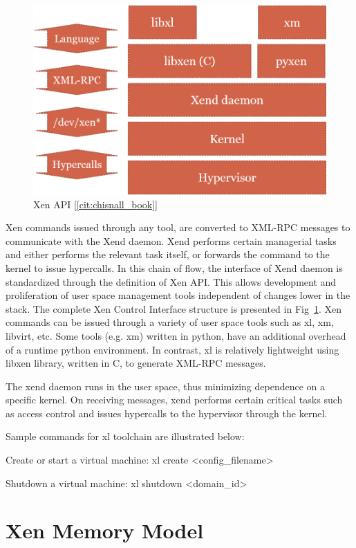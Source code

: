 \begin{figure}[H]
\centering
\includegraphics[scale=0.7]{figures/XEN_API.png}
\caption{Xen API [\ref{cit:chisnall_book}]}
\label{fig:xen_api}
\end{figure}
Xen commands issued through any tool, are converted to XML-RPC messages to communicate with the Xend daemon. Xend performs certain managerial tasks and either performs the relevant task itself, or forwards the command to the kernel to issue hypercalls. In this chain of flow, the interface of Xend daemon is standardized through the definition of Xen API. This allows development and proliferation of user space management tools independent of changes lower in the stack. The complete Xen Control Interface structure is presented in Fig~\ref{fig:xen_api}. Xen commands can be issued through a variety of user space tools such as xl, xm, libvirt, etc. Some tools (e.g. xm) written in python, have an additional overhead of a runtime python environment. In contrast, xl is relatively lightweight using libxen library, written in C, to generate XML-RPC messages.

The xend daemon runs in the user space, thus minimizing dependence on a specific kernel. On receiving messages, xend performs certain critical tasks such as access control and issues hypercalls to the hypervisor through the kernel.

Sample commands for xl toolchain are illustrated below:

Create or start a virtual machine: xl create <config\_filename>

Shutdown a virtual machine: xl shutdown <domain\_id> 


\section{Xen Memory Model}

